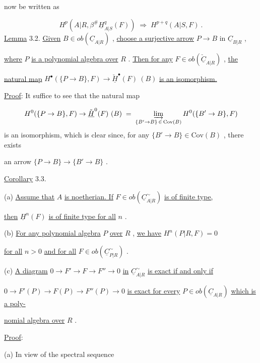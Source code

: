 now be written as

\begin{equation*}
H^{p}(A|R,\beta^{\#}\underline{H}^{q}_{A|S}(F)) \;\Rightarrow\; H^{p+q}(A|S,F) \ .
\end{equation*}
\underline{Lemma} 3.2.  \underline{Given}  $B \in ob(\underline{C}_{A|R})$  , \underline{choose a surjective arrow}  $P → B$  in  $\underline{C}_{B|R}$  ,

\underline{where}  $P$  \underline{is a polynomial algebra over}  $R$  . \underline{Then for any}  $F \in ob(\check{\underline{C}}_{A|R})$  , \underline{the}

\underline{natural map}  $H^{\bullet}(\{P \to B\},F) \to \check{\underline{H}}^{\bullet}(F)\ (B)$  \underline{is an isomorphism.}

\underline{Proof}:  It suffice to see that the natural map

\begin{equation*}
H^{0}(\{P \to B\},F) \to \check{\underline{H}}^{0}(F)\ (B) \;=\; \varinjlim_{\{B' \to B\}\, \in\, \mathrm{Cov}(B)} H^{0}(\{B' \to B\},F)
\end{equation*}
is an isomorphism, which is clear since, for any  $\{B' \to B\} \in \mathrm{Cov}(B)$  , there exists

an arrow  $\{P \to B\} \to \{B' \to B\}$  .


\underline{Corollary} 3.3.

(a)  \underline{Assume that}  $A$  \underline{is noetherian. If}  $F \in ob(\underline{C}^{\sim}_{A|R})$  \underline{is of finite type,}

\underline{then}  $\underline{H}^{n}(F)$  \underline{is of finite type for all}  $n$  .

(b)  \underline{For any polynomial algebra}  $P$  \underline{over}  $R$  , \underline{we have}  $H^{n}(P|R,F) = 0$

\underline{for all}  $n > 0$  \underline{and for all}  $F \in ob(\underline{C}^{\sim}_{P|R})$  .

(c)  \underline{A diagram}  $0 \to F' \to F \to F'' \to 0$  \underline{in}  $\underline{C}^{\sim}_{A|R}$  \underline{is exact if and only if}

$0 \to F'(P) \to F(P) \to F''(P) \to 0$  \underline{is exact for every}  $P \in ob(\underline{C}_{A|R})$  \underline{which is a poly-}

\underline{nomial algebra over}  $R$  .

\underline{Proof}:

(a)  In view of the spectral sequence

